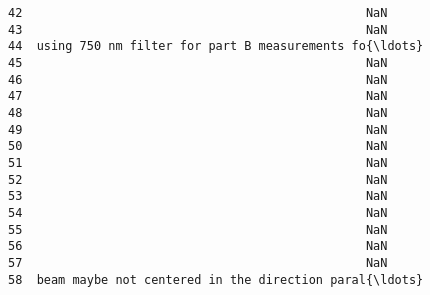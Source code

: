 \documentclass[11pt]{article}
\begin{document}
\begin{tcolorbox}[breakable, size=fbox, boxrule=.5pt, pad at break*=1mm, opacityfill=0]
\begin{Verbatim}[commandchars=\\\{\}]
42                                                NaN
43                                                NaN
44  using 750 nm filter for part B measurements fo{\ldots}
45                                                NaN
46                                                NaN
47                                                NaN
48                                                NaN
49                                                NaN
50                                                NaN
51                                                NaN
52                                                NaN
53                                                NaN
54                                                NaN
55                                                NaN
56                                                NaN
57                                                NaN
58  beam maybe not centered in the direction paral{\ldots}


\end{Verbatim}
\end{tcolorbox}
\end{document}
